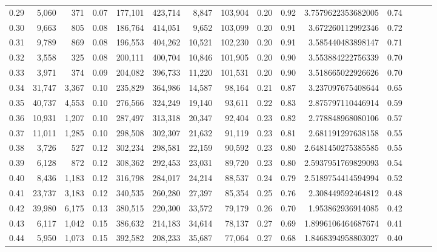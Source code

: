 \begin{tabular}{rrrrrrrrrrrrrrr}
0.29 &   5,060 &    371 &  0.07 &  177,101 &  423,714 &    8,847 &  103,904 &  0.20 &  0.92 &    3.7579622353682005 &      0.74 \\
0.30 &   9,663 &    805 &  0.08 &  186,764 &  414,051 &    9,652 &  103,099 &  0.20 &  0.91 &     3.672260112992346 &      0.72 \\
0.31 &   9,789 &    869 &  0.08 &  196,553 &  404,262 &   10,521 &  102,230 &  0.20 &  0.91 &     3.585440483898147 &      0.71 \\
0.32 &   3,558 &    325 &  0.08 &  200,111 &  400,704 &   10,846 &  101,905 &  0.20 &  0.90 &     3.553884222756339 &      0.70 \\
0.33 &   3,971 &    374 &  0.09 &  204,082 &  396,733 &   11,220 &  101,531 &  0.20 &  0.90 &     3.518665022926626 &      0.70 \\
0.34 &  31,747 &  3,367 &  0.10 &  235,829 &  364,986 &   14,587 &   98,164 &  0.21 &  0.87 &     3.237097675408644 &      0.65 \\
0.35 &  40,737 &  4,553 &  0.10 &  276,566 &  324,249 &   19,140 &   93,611 &  0.22 &  0.83 &     2.875797110446914 &      0.59 \\
0.36 &  10,931 &  1,207 &  0.10 &  287,497 &  313,318 &   20,347 &   92,404 &  0.23 &  0.82 &     2.778848968080106 &      0.57 \\
0.37 &  11,011 &  1,285 &  0.10 &  298,508 &  302,307 &   21,632 &   91,119 &  0.23 &  0.81 &     2.681191297638158 &      0.55 \\
0.38 &   3,726 &    527 &  0.12 &  302,234 &  298,581 &   22,159 &   90,592 &  0.23 &  0.80 &    2.6481450275385585 &      0.55 \\
0.39 &   6,128 &    872 &  0.12 &  308,362 &  292,453 &   23,031 &   89,720 &  0.23 &  0.80 &    2.5937951769829093 &      0.54 \\
0.40 &   8,436 &  1,183 &  0.12 &  316,798 &  284,017 &   24,214 &   88,537 &  0.24 &  0.79 &    2.5189754414594994 &      0.52 \\
0.41 &  23,737 &  3,183 &  0.12 &  340,535 &  260,280 &   27,397 &   85,354 &  0.25 &  0.76 &     2.308449592464812 &      0.48 \\
0.42 &  39,980 &  6,175 &  0.13 &  380,515 &  220,300 &   33,572 &   79,179 &  0.26 &  0.70 &     1.953862936914085 &      0.42 \\
0.43 &   6,117 &  1,042 &  0.15 &  386,632 &  214,183 &   34,614 &   78,137 &  0.27 &  0.69 &    1.8996106464687674 &      0.41 \\
0.44 &   5,950 &  1,073 &  0.15 &  392,582 &  208,233 &   35,687 &   77,064 &  0.27 &  0.68 &    1.8468394958803027 &      0.40 \\

\end{tabular}
